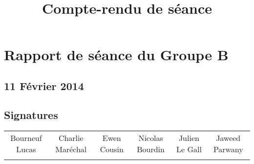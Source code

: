 
\title{Compte-rendu de séance}
\author{}
\date{} 

\pagestyle{empty} 
\pagestyle{fancy} 







\chapter*{Rapport de séance du Groupe B}	
\section*{11 Février 2014}
	\vspace{12.1cm}


\section*{Signatures}

    	\begin{tabular*}{0.75\textwidth}{c | c | c | c | c | c}
    	    Bourneuf Lucas & Charlie Maréchal & Ewen Cousin & Nicolas Bourdin & Julien Le Gall & Jaweed Parwany\\
     	     & & & & &
    	\end{tabular*}




